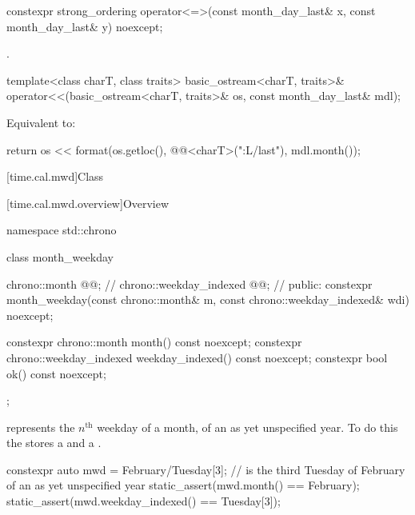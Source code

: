 %
\begin{itemdecl}
constexpr strong_ordering operator<=>(const month_day_last& x, const month_day_last& y) noexcept;
\end{itemdecl}

\begin{itemdescr}
\pnum
\returns
{}.
\end{itemdescr}

%
\begin{itemdecl}
template<class charT, class traits>
  basic_ostream<charT, traits>&
    operator<<(basic_ostream<charT, traits>& os, const month_day_last& mdl);
\end{itemdecl}

\begin{itemdescr}
\pnum
\effects
Equivalent to:
\begin{codeblock}
return os << format(os.getloc(), @@<charT>("{:L}/last"), mdl.month());
\end{codeblock}
\end{itemdescr}

[time.cal.mwd]{Class }

[time.cal.mwd.overview]{Overview}

\begin{codeblock}
namespace std::chrono {
  class month_weekday {
    chrono::month           @@;         // \expos
    chrono::weekday_indexed @@;       // \expos
  public:
    constexpr month_weekday(const chrono::month& m, const chrono::weekday_indexed& wdi) noexcept;

    constexpr chrono::month           month()           const noexcept;
    constexpr chrono::weekday_indexed weekday_indexed() const noexcept;
    constexpr bool ok() const noexcept;
  };
}
\end{codeblock}

\pnum
{} represents the $n^\text{th}$ weekday of a month,
of an as yet unspecified year.
To do this the  stores a  and a .

\pnum
\begin{example}
\begin{codeblock}
constexpr auto mwd
    = February/Tuesday[3];              //  is the third Tuesday of February of an as yet unspecified year
static_assert(mwd.month() == February);
static_assert(mwd.weekday_indexed() == Tuesday[3]);
\end{codeblock}
\end{example}

